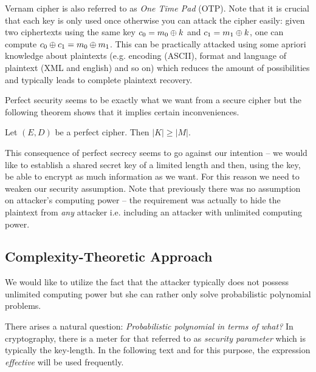\begin{note}
	Vernam cipher is also referred to as {\em One Time Pad} (OTP). Note that it is crucial that each key is only used once otherwise you can attack the cipher easily: given two ciphertexts using the same key $c_0=m_0\oplus k$ and $c_1=m_1\oplus k$, one can compute $c_0\oplus c_1 = m_0\oplus m_1$. This can be practically attacked using some apriori knowledge about plaintexts (e.g. encoding (ASCII), format and language of plaintext (XML and english) and so on) which reduces the amount of possibilities and typically leads to complete plaintext recovery.
\end{note}

Perfect security seems to be exactly what we want from a secure cipher but the following theorem shows that it implies certain inconveniences.

\begin{thm}
\label{thm:kgeqm}
	Let $(E,D)$ be a perfect cipher. Then $|K| \geq |M|$.
\end{thm}

\begin{note}
\label{note:intent}
	This consequence of perfect secrecy seems to go against our intention -- we would like to establish a shared secret key of a limited length and then, using the key, be able to encrypt as much information as we want. For this reason we need to weaken our security assumption. Note that previously there was no assumption on attacker's computing power -- the requirement was actually to hide the  plaintext from {\em any} attacker i.e. including an attacker with unlimited computing power.
\end{note}


\subsection{Complexity-Theoretic Approach}

We would like to utilize the fact that the attacker typically does not possess unlimited computing power but she can rather only solve probabilistic polynomial problems.

\begin{note}
\label{note:polyinterms}
	There arises a natural question: {\em Probabilistic polynomial in terms of what?} In cryptography, there is a meter for that referred to as {\em security parameter} which is typically the key-length. In the following text and for this purpose, the expression {\em effective} will be used frequently.
\end{note}

